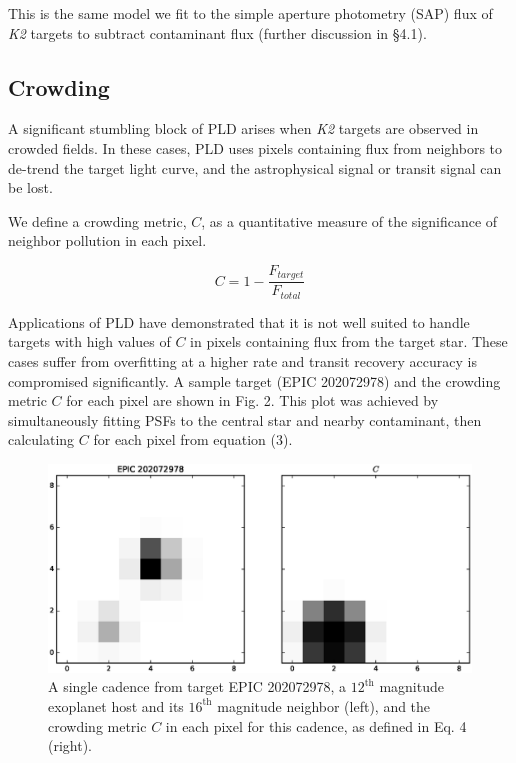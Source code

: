 \documentclass[12pt,preprint]{aastex}
\begin{document}
This is the same model we fit to the simple aperture photometry (SAP) flux of \textit{K2} targets to subtract contaminant flux (further discussion in \S 4.1).

\subsection{Crowding}

A significant stumbling block of PLD arises when \textit{K2} targets are observed in crowded fields. In these cases, PLD uses pixels containing flux from neighbors to de-trend the target light curve, and the astrophysical signal or transit signal can be lost.

We define a crowding metric, $C$, as a quantitative measure of the significance of neighbor pollution in each pixel.

\[
\tag{4}
C = 1 - \frac{F_{target}}{F_{total}}
\]

Applications of PLD have demonstrated that it is not well suited to handle targets with high values of $C$ in pixels containing flux from the target star. These cases suffer from overfitting at a higher rate and transit recovery accuracy is compromised significantly. A sample target (EPIC 202072978) and the crowding metric $C$ for each pixel are shown in Fig. 2. This plot was achieved by simultaneously fitting PSFs to the central star and nearby contaminant, then calculating $C$ for each pixel from equation (3).

\begin{figure}[h]
	\centering
	\includegraphics[width=1.0\linewidth]{cr.eps}
	\caption{A single cadence from target EPIC 202072978, a $12^{\text{th}}$ magnitude exoplanet host and its $16^{\text{th}}$ magnitude neighbor (left), and the crowding metric $C$ in each pixel for this cadence, as defined in Eq. 4 (right).}
	\label{fig:crowding}
\end{figure}
\end{document}
